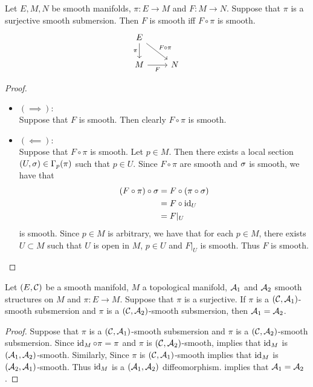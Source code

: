 \documentclass{book}
\begin{document}
	\begin{ex} 
		Let $E, M, N$ be smooth manifolds, $\pi: E \rightarrow M$ and $F: M \rightarrow N$. Suppose that $\pi$ is a surjective smooth submersion. Then $F$ is smooth iff $F \circ \pi$ is smooth. 
		\[ 
		\begin{tikzcd}
			E \arrow[d, "\pi"'] \arrow[dr, "F \circ \pi"] &   \\
			M \arrow[r, "F"'] &  N
		\end{tikzcd}
		\]
	\end{ex}

	\begin{proof}\
		\begin{itemize}
			\item $(\implies):$ \\
			Suppose that $F$ is smooth. Then clearly $F \circ \pi$ is smooth.
			\item $(\impliedby):$ \\
			Suppose that $F \circ \pi$ is smooth. Let $p \in M$. Then there exists a local section $(U, \sigma) \in \Gamma_p(\pi)$ such that $p \in U$. Since $F \circ \pi$ are smooth and $\sigma$ is smooth, we have that 
			\begin{align*}
				(F \circ \pi) \circ \sigma 
				& = F \circ (\pi \circ \sigma) \\
				& = F \circ \operatorname{id}_U \\
				& = F|_U 
			\end{align*}
			is smooth. Since $p \in M$ is arbitrary, we have that for each $p \in M$, there exists $U \subset M$ such that $U$ is open in $M$, $p \in U$ and $F|_U$ is smooth. Thus $F$ is smooth.  
		\end{itemize}
	\end{proof}
	

	\begin{ex} 
		Let $(E, \mathcal{C})$ be a smooth manifold, $M$ a topological manifold, $\mathcal{A}_1$ and $\mathcal{A}_2$ smooth structures on $M$ and $\pi: E \rightarrow M$. Suppose that $\pi$ is a surjective. If $\pi$ is a $(\mathcal{C}, \mathcal{A}_1)$-smooth subsmersion and $\pi$ is a $(\mathcal{C}, \mathcal{A}_2)$-smooth subsmersion, then $\mathcal{A}_1 = \mathcal{A}_2$. 
	\end{ex}	

	\begin{proof}
		Suppose that $\pi$ is a $(\mathcal{C}, \mathcal{A}_1)$-smooth subsmersion and $\pi$ is a $(\mathcal{C}, \mathcal{A}_2)$-smooth subsmersion. Since $\operatorname{id}_M \circ \pi = \pi$ and $\pi$ is $(\mathcal{C}, \mathcal{A}_2)$-smooth,  implies that $\operatorname{id}_M$ is $(\mathcal{A}_1, \mathcal{A}_2)$-smooth. Similarly, Since $\pi$ is $(\mathcal{C}, \mathcal{A}_1)$-smooth  implies that $\operatorname{id}_M$ is $(\mathcal{A}_2, \mathcal{A}_1)$-smooth. Thus $\operatorname{id}_M$ is a $(\mathcal{A}_1, \mathcal{A}_2)$ diffeomorphism.  implies that $\mathcal{A}_1 = \mathcal{A}_2$. 
	\end{proof}
\end{document}
